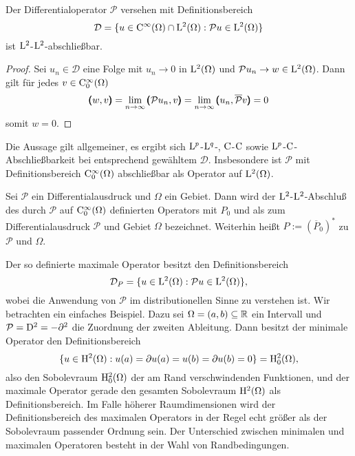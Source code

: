 \begin{lem}
Der Differentialoperator $\mathcal P$ versehen mit Definitionsbereich
\begin{equation}
  \mathcal D= \{ u\in\mathrm C^\infty(\Omega) \cap \mathrm L^2(\Omega) :  \mathcal Pu\in\mathrm L^2(\Omega) \}
\end{equation}
ist $\mathrm L^2$-$\mathrm L^2$-abschließbar.
\end{lem}
\begin{proof}
Sei $u_n\in\mathcal D$ eine Folge mit $u_n\to 0$ in $\mathrm L^2(\Omega)$ und $\mathcal Pu_n \to w\in\mathrm L^2(\Omega)$. Dann gilt f\"ur jedes 
$v\in\mathrm C^\infty_0(\Omega)$
\begin{equation}
 \pmb(w,v\pmb)=\lim_{n\to\infty}   \pmb(\mathcal Pu_n,v\pmb) = \lim_{n\to\infty} \pmb(u_n,\overline{\mathcal P}v\pmb) = 0
\end{equation}
somit $w=0$.
\end{proof}

Die Aussage gilt allgemeiner, es ergibt sich $\mathrm L^p$-$\mathrm L^q$-, $\mathrm C$-$\mathrm C$ sowie $\mathrm L^p$-$\mathrm C$-Abschließbarkeit bei entsprechend gewähltem $\mathcal D$. Insbesondere ist $\mathcal P$ mit Definitionsbereich $\mathrm C^\infty_0(\Omega)$ abschließbar als Operator auf $\mathrm L^2(\Omega)$. 

\begin{df} 
Sei $\mathcal P$ ein Differentialausdruck und $\Omega$ ein Gebiet. Dann wird der $\mathrm L^2$-$\mathrm L^2$-Abschluß des durch $\mathcal P$ auf $\mathrm C_0^\infty(\Omega)$ definierten Operators mit $P_0$ und als  zum Differentialausdruck $\mathcal P$ und Gebiet $\Omega$ bezeichnet. 
Weiterhin heißt $P := (\overline P_0)^*$  zu $\mathcal P$ und $\Omega$.
\end{df}

Der so definierte maximale Operator besitzt den Definitionsbereich
\begin{equation}
   \mathcal D_P = \{ u\in\mathrm L^2(\Omega) : \mathcal Pu \in\mathrm L^2(\Omega)\},
\end{equation}
wobei die Anwendung von $\mathcal P$ im distributionellen Sinne zu verstehen ist. Wir betrachten ein einfaches Beispiel. Dazu sei $\Omega=(a,b)\subseteq\mathbb R$ ein Intervall und $\mathcal P = \mathrm D^2 = - \partial^2$ die Zuordnung der zweiten Ableitung. Dann besitzt der minimale Operator den Definitionsbereich
\begin{equation}
    \{ u\in\mathrm H^2(\Omega) :  u(a)=\partial u(a)=u(b)=\partial u(b) = 0\} = \mathrm H^2_0(\Omega),
\end{equation}
also den Sobolevraum $\mathrm H^2_0(\Omega)$ der am Rand verschwindenden Funktionen, und der maximale Operator gerade den gesamten Sobolevraum $\mathrm H^2(\Omega)$ als Definitionsbereich. Im Falle h\"oherer Raumdimensionen wird der Definitionsbereich des maximalen Operators in der Regel echt größer als der Sobolevraum passender Ordnung sein.
Der Unterschied zwischen minimalen und maximalen Operatoren besteht in der Wahl von Randbedingungen. 

